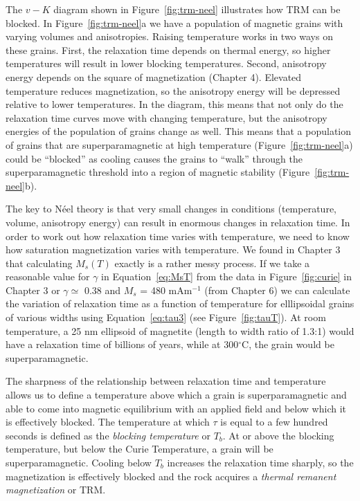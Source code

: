 The
 $v-K$ diagram shown in Figure~\ref{fig:trm-neel} illustrates how TRM can be blocked.  In Figure~\ref{fig:trm-neel}a we have a population of magnetic grains with varying volumes and anisotropies.   Raising temperature works in two ways on these grains.  First,  the
  relaxation time depends on thermal energy, so higher temperatures will result in lower blocking temperatures.  Second,  anisotropy energy depends on the square of magnetization (Chapter 4).  Elevated temperature reduces magnetization,   so  the anisotropy energy will be depressed  relative to lower temperatures.   In the diagram, this means that not only do the relaxation time curves move with changing temperature, but the anisotropy energies of the population of grains change as well.    This means that a population of grains that are superparamagnetic at high temperature (Figure~\ref{fig:trm-neel}a) could be ``blocked'' as cooling causes the grains to ``walk'' through the superparamagnetic threshold into a region of magnetic stability (Figure~\ref{fig:trm-neel}b).   



The key to 
N\'eel theory is that very small changes in conditions (temperature, volume, anisotropy energy) can result in enormous changes in relaxation time.   In order to work out how relaxation time varies with temperature, we need to know how saturation magnetization varies with temperature.   We found  in Chapter 3 that calculating $M_s (T)$  exactly is a rather messy process.    If we take a reasonable value for   $\gamma$  in Equation~\ref{eq:MsT} from the data in Figure~\ref{fig:curie} in Chapter 3   or  $\gamma \simeq$ 0.38     and  $M_s$ = 480 mAm$^{-1}$ (from Chapter 6)  we can calculate the variation of relaxation time as a function of temperature for  elllipsoidal grains of various widths using Equation~\ref{eq:tau3} (see  Figure~\ref{fig:tauT}).  At room temperature, a 25 nm ellipsoid of magnetite (length to width ratio of 1.3:1)  would have a relaxation time of billions of years, while at 300$^{\circ}$C, the grain would be   superparamagnetic.  




The sharpness of the relationship between relaxation time and temperature allows us to define a  temperature  above which a grain is 
superparamagnetic and able to come into
 magnetic equilibrium with an applied field and below which it is effectively blocked.  The temperature at which $\tau $ is
equal to a few hundred seconds  is defined as the 
{\it blocking temperature} or $T_b$.  At or above the blocking temperature, but  below the Curie
Temperature, a grain will be 
superparamagnetic.  Cooling  below $T_b$  increases 
the relaxation time sharply, so the magnetization is effectively blocked and the rock acquires a
 {\it thermal remanent magnetization} or TRM.

